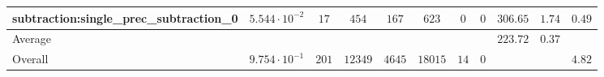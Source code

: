 \begin{tabular}{|l|c|c|c|c|c|c|c|c|c|c|}
subtraction:single\_prec\_subtraction\_0         & $ 5.544 \cdot 10^{-2} $ & $ 17     $ & $ 454   $ & $ 167  $ & $ 623   $ & $ 0  $ & $ 0 $ & $ 306.65      $ & $ 1.74    $ & $ 0.49    $ \\
\hline
Average                                          & $                     $ & $        $ & $       $ & $      $ & $       $ & $    $ & $   $ & $ 223.72      $ & $ 0.37    $ & $         $ \\
\hline
Overall                                          & $ 9.754 \cdot 10^{-1} $ & $ 201    $ & $ 12349 $ & $ 4645 $ & $ 18015 $ & $ 14 $ & $ 0 $ & $             $ & $         $ & $ 4.82    $ \\
\hline
\end{tabular}
